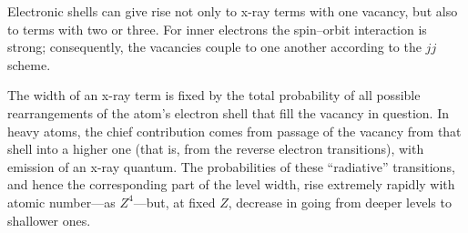Electronic shells can give rise not only to x-ray terms with one vacancy, but also to terms with two or three. For inner electrons the spin--orbit interaction is strong; consequently, the vacancies couple to one another according to the $jj$ scheme.

The width of an x-ray term is fixed by the total probability of all possible rearrangements of the atom's electron shell that fill the vacancy in question. In heavy atoms, the chief contribution comes from passage of the vacancy from that shell into a higher one (that is, from the reverse electron transitions), with emission of an x-ray quantum. The probabilities of these ``radiative'' transitions, and hence the corresponding part of the level width, rise extremely rapidly with atomic number---as $Z^4$---but, at fixed $Z$, decrease in going from deeper levels to shallower ones.
